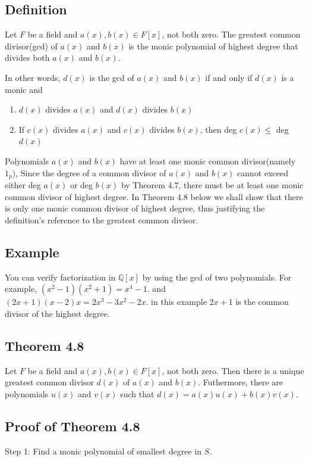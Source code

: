 \documentclass{article}
\begin{document}
\subsection*{Definition}
Let $F$ be a field and $a(x), b(x) \in F[x]$, not both zero. The greatest common divisor(gcd) of
$a(x)$ and $b(x)$ is the monic polynomial of highest degree that divides both $a(x)$ and $b(x)$.

In other words, $d(x)$ is the gcd of $a(x)$ and $b(x)$ if and only if $d(x)$ is a monic and
\begin{enumerate}
    \item $d(x)$ divides $a(x)$ and $d(x)$ divides $b(x)$
    \item If $c(x)$ divides $a(x)$ and $c(x)$ divides $b(x)$, then deg $c(x) \leq$ deg $d(x)$
\end{enumerate}

Polynomials $a(x)$ and $b(x)$ have at least one monic common divisor(namely $1_p$), Since
the degree of a common divisor of $a(x)$ and $b(x)$ cannot exceed either deg $a(x)$ or deg $b(x)$
by Theorem 4.7, there must be at least one monic common divisor of highest degree. In
Theorem 4.8 below we shall show that there is only one monic common divisor of highest
degree, thus justifying the definition's reference to the greatest common divisor.

\subsection*{Example}

You can verify factorization in $\mathbb{Q}[x]$ by using the gcd of two polynomials. For example, $(x^2-1)(x^2+1) = x^4-1$.
and $(2x+1)(x-2)x = 2x^3-3x^2-2x$. in this example $2x+1$ is the common divisor of the highest degree.

\subsection*{Theorem 4.8}
Let $F$ be a field and $a(x), b(x) \in F[x]$, not both zero. Then there is a unique greatest common divisor
$d(x)$ of $a(x)$ and $b(x)$. Futhermore, there are polynomials $u(x)$ and $v(x)$ such that
$d(x) = a(x)u(x) + b(x)v(x)$.

\subsection*{Proof of Theorem 4.8}

Step 1: Find a monic polynomial of smallest degree in $S$.
\end{document}

